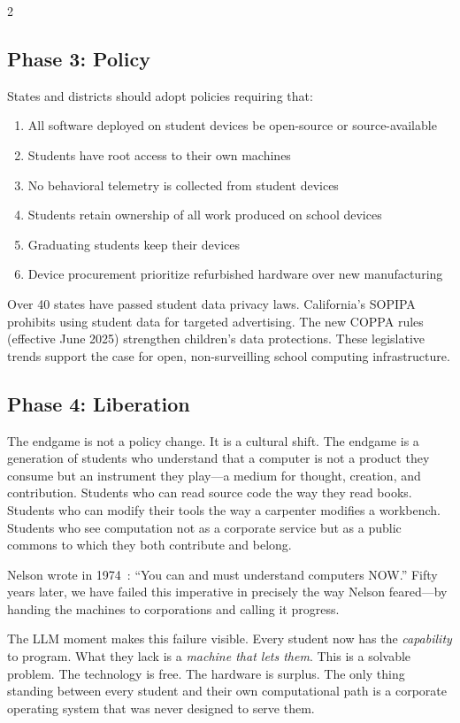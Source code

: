 \documentclass[11pt, a4paper]{article}
\begin{document}
\begin{multicols}{2}
\subsection{Phase 3: Policy}

States and districts should adopt policies requiring that:

\begin{enumerate}
  \item All software deployed on student devices be open-source or source-available
  \item Students have root access to their own machines
  \item No behavioral telemetry is collected from student devices
  \item Students retain ownership of all work produced on school devices
  \item Graduating students keep their devices
  \item Device procurement prioritize refurbished hardware over new manufacturing
\end{enumerate}

Over 40 states have passed student data privacy laws. California's SOPIPA prohibits using student data for targeted advertising. The new COPPA rules (effective June 2025) strengthen children's data protections. These legislative trends support the case for open, non-surveilling school computing infrastructure.

\subsection{Phase 4: Liberation}

The endgame is not a policy change. It is a cultural shift. The endgame is a generation of students who understand that a computer is not a product they consume but an instrument they play---a medium for thought, creation, and contribution. Students who can read source code the way they read books. Students who can modify their tools the way a carpenter modifies a workbench. Students who see computation not as a corporate service but as a public commons to which they both contribute and belong.

Nelson wrote in 1974~\citep{nelson1974computerlib}: ``You can and must understand computers NOW.'' Fifty years later, we have failed this imperative in precisely the way Nelson feared---by handing the machines to corporations and calling it progress.

The LLM moment makes this failure visible. Every student now has the \emph{capability} to program. What they lack is a \emph{machine that lets them}. This is a solvable problem. The technology is free. The hardware is surplus. The only thing standing between every student and their own computational path is a corporate operating system that was never designed to serve them.


\end{multicols}
\end{document}
